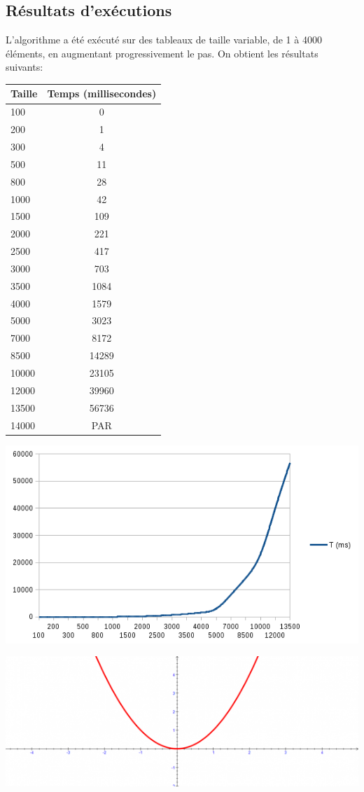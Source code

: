 \documentclass[a4paper, 12pt]{article}
\begin{document}
\subsection{Résultats d’exécutions}
L'algorithme a été exécuté sur des tableaux de taille variable, de 1 à 4000 éléments, en augmentant progressivement le pas. On obtient les résultats suivants:

\begin{minipage}[c]{0.4\linewidth}
   \begin{tabular}{|l|c|}
      \hline
      Taille & Temps (millisecondes) \\
      \hline
   100	& 0 \\
   200	& 1\\
   300	& 4\\
   500	& 11\\
   800	& 28\\
   1000	& 42\\
   1500	& 109\\
   2000	& 221\\
   2500	& 417\\
   3000	& 703\\
   3500	& 1084\\
   4000	& 1579\\
   5000	& 3023\\
   7000	& 8172\\
   8500	& 14289\\
   10000 & 	23105\\
   12000& 	39960\\
   13500& 	56736\\
   14000& 	PAR\\
   \end{tabular}
\end{minipage}\hfill
\begin{minipage}[c]{0.6\linewidth}
	\includegraphics[scale=0.6]{curve_algo_1.png}
	
	\includegraphics[scale=0.5]{curve_n_2.png}
\end{minipage}
\end{document}
